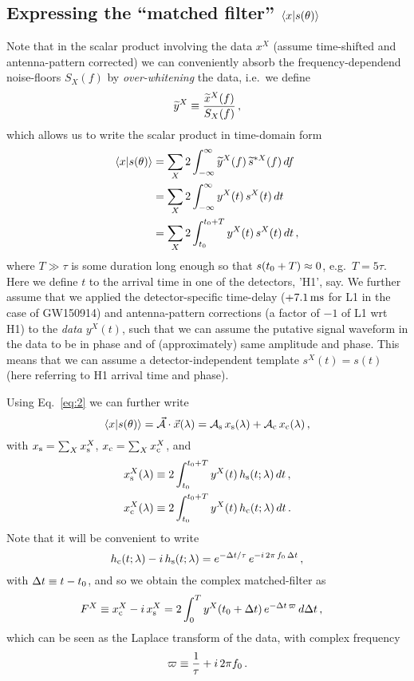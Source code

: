 \documentclass[aps,prd,onecolumn,notitlepage,nofootinbib,superscriptaddress,altaffilletter,floatfix]{revtex4-1}
\begin{document}
\subsection{Expressing the ``matched filter'' $\langle x|s(\theta)\rangle$}
\label{sec:computing-scalarxs}

Note that in the scalar product involving the data $x^X$ (assume time-shifted and antenna-pattern corrected) we can conveniently absorb the
frequency-dependend noise-floors $S_X(f)$ by \emph{over-whitening} the data, i.e.\ we define
\begin{equation}
  \label{eq:12}
  \widetilde{y}^X \equiv \frac{\widetilde{x}^X(f)}{S_X(f)}\,,
\end{equation}
which allows us to write the scalar product in time-domain form
\begin{align}
  \label{eq:13}
  \langle x|s(\theta)\rangle &= \sum_X 2\int_{-\infty}^{\infty} \widetilde{y}^X(f)\,\widetilde{s}^{*X}(f)\,df \\
  &= \sum_X 2\int_{-\infty}^{\infty} y^X(t)\,s^X(t)\,dt \\
  &= \sum_X 2\int_{t_0}^{t_0 + T} y^X(t)\,s^X(t)\,dt\,,
\end{align}
where $T \gg \tau$ is some duration long enough so that $s(t_0+T)\approx0$, e.g.\ $T=5\tau$. Here we define $t$ to the arrival time in one of
the detectors, 'H1', say. We further assume that we applied the detector-specific time-delay ($+7.1\,\mathrm{ms}$ for L1 in the case of GW150914) and
antenna-pattern corrections (a factor of $-1$ of L1 wrt H1) to the \emph{data} $y^X(t)$, such that we can assume the putative signal waveform in the
data to be in phase and of (approximately) same amplitude and phase. This means that we can assume a detector-independent template $s^X(t) = s(t)$
(here referring to H1 arrival time and phase).

Using Eq.~\eqref{eq:2} we can further write
\begin{equation}
  \label{eq:9}
  \langle x|s(\theta)\rangle = \vec{\mathcal{A}}\cdot\vec{x}(\lambda) = \mathcal{A}_{\mathrm{s}}\,x_{\mathrm{s}}(\lambda) + \mathcal{A}_{\mathrm{c}}\,x_{\mathrm{c}}(\lambda)\,,
\end{equation}
with $x_{\mathrm{s}}=\sum_X x_{\mathrm{s}}^X$, $x_{\mathrm{c}}=\sum_X x_{\mathrm{c}}^X$, and
\begin{align}
  \label{eq:10}
  x_{\mathrm{s}}^X(\lambda) &\equiv 2\int_{t_0}^{t_0+T} y^X(t)\,h_\mathrm{s}(t;\lambda)\,dt\,,\\
  x_{\mathrm{c}}^X(\lambda) &\equiv 2\int_{t_0}^{t_0+T} y^X(t)\,h_\mathrm{c}(t;\lambda)\,dt\,.
\end{align}
Note that it will be convenient to write
\begin{equation}
  \label{eq:38}
  h_\mathrm{c}(t;\lambda) - i\,h_\mathrm{s}(t;\lambda) = e^{-\Delta t/\tau}\,e^{-i\,2\pi\,f_0\,\Delta t}\,,
\end{equation}
with $\Delta t \equiv t - t_0$, and so we obtain the complex matched-filter as
\begin{align}
  \label{eq:16}
  F^X \equiv x_{\mathrm{c}}^X - i\,x_{\mathrm{s}}^X &= 2 \int_{0}^{T} y^X(t_0+\Delta t)\,e^{-\Delta t \,\varpi}\,d\Delta t\,,
\end{align}
which can be seen as the Laplace transform of the data, with complex frequency
\begin{equation}
  \label{eq:27}
  \varpi \equiv \frac{1}{\tau} + i\,2\pi f_0\,.
\end{equation}
\end{document}
